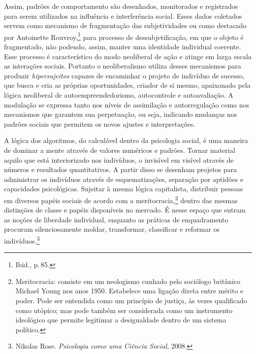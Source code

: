 Assim, padrões de comportamento são desenhados, monitorados e
registrados para serem utilizados na influência e interferência social.
Esses dados coletados servem como mecanismo de fragmentação das
subjetividades ou como destacado por Antoinette Rouvroy,\footnote{Ibid., p.\,85.} para processo de dessubjetificação, em que o objeto é
fragmentado, não podendo, assim, manter uma identidade individual
coerente. Esse processo é característico do modo neoliberal de ação e
atinge em larga escala as interações sociais. Portanto o neoliberalismo
utiliza desses mecanismos para produzir \emph{hipersujeitos} capazes de
encaminhar o projeto de indivíduo de sucesso, que busca e cria as
próprias oportunidades, criador de si mesmo, apaixonado pela lógica
neoliberal de autoempreendedorismo, autocontrole e autoavaliação. A
modulação se expressa tanto nos níveis de assimilação e autorregulação
como nos mecanismos que garantem sua perpetuação, ou seja, indicando
mudanças nos padrões sociais que permitem os novos ajustes e
interpretações.

A lógica dos algoritmos, do calculável dentro da psicologia social, é
uma maneira de dominar a mente através de valores numéricos e padrões.
Tornar material aquilo que está interiorizado nos indivíduos, o
invisível em visível através de números e resultados quantitativos. A
partir disso se desenham projetos para administrar os indivíduos através
de esquematizações, separação por aptidões e capacidades psicológicas.
Sujeitar à mesma lógica capitalista, distribuir pessoas em diversos
papéis sociais de acordo com a meritocracia,\footnote{Meritocracia:
  consiste em um neologismo cunhado pelo sociólogo britânico Michael
  Young nos anos 1950. Estabelece uma ligação direta entre mérito e
  poder. Pode ser entendida como um princípio de justiça, às vezes
  qualificado como utópico; mas pode também ser considerada como um
  instrumento ideológico que permite legitimar a desigualdade dentro de
  um sistema político.} dentro das mesmas distinções de classe e papéis
disponíveis no mercado. É nesse espaço que entram as noções de liberdade
individual, enquanto as práticas de enquadramento procuram
silenciosamente moldar, transformar, classificar e reformar os
indivíduos.\footnote{Nikolas Rose. \emph{Psicologia como uma Ciência Social}, 2008.}

